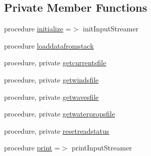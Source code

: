 \subsection*{Private Member Functions}
\begin{DoxyCompactItemize}
\item 
procedure \mbox{\hyperlink{structsimulationinputstreamer__mod_1_1input__streamer__class_a52470b6d47f3ce270f9fdc14ccfa25d5}{initialize}} =$>$ init\+Input\+Streamer
\item 
procedure \mbox{\hyperlink{structsimulationinputstreamer__mod_1_1input__streamer__class_a76d4d67d354652f319fd93a340049cfb}{loaddatafromstack}}
\item 
procedure, private \mbox{\hyperlink{structsimulationinputstreamer__mod_1_1input__streamer__class_a94846e4dd810043b8a37ad3c3956cc90}{getcurrentsfile}}
\item 
procedure, private \mbox{\hyperlink{structsimulationinputstreamer__mod_1_1input__streamer__class_af6bcefe11cfb52813a77d33e34f00b49}{getwindsfile}}
\item 
procedure, private \mbox{\hyperlink{structsimulationinputstreamer__mod_1_1input__streamer__class_afb42eb9df1c82a466e655819ae4ca5d3}{getwavesfile}}
\item 
procedure, private \mbox{\hyperlink{structsimulationinputstreamer__mod_1_1input__streamer__class_aa3dc916f99caa5cf314f85b425ea666d}{getwaterpropsfile}}
\item 
procedure, private \mbox{\hyperlink{structsimulationinputstreamer__mod_1_1input__streamer__class_aa1582178235a956bb2aae6c98d25fa7a}{resetreadstatus}}
\item 
procedure \mbox{\hyperlink{structsimulationinputstreamer__mod_1_1input__streamer__class_af3faf35d98fba46362d3771ab1dac9ba}{print}} =$>$ print\+Input\+Streamer
\end{DoxyCompactItemize}
